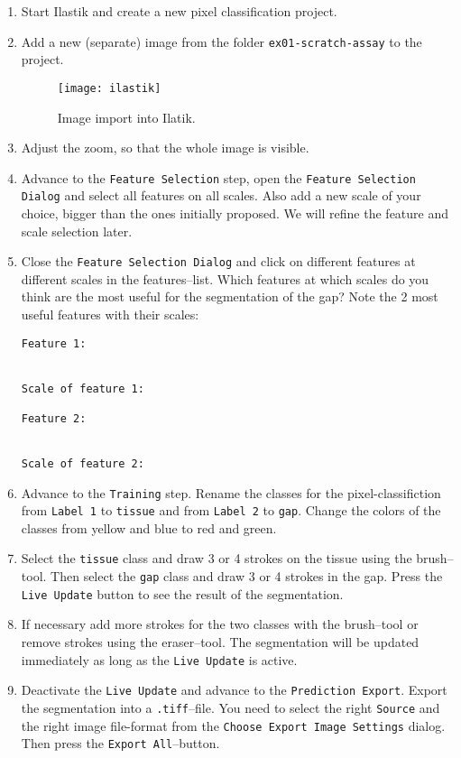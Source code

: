 \begin{enumerate}
\item Start Ilastik and create a new pixel classification project.
\item Add a new (separate) image from the folder {\tt ex01-scratch-assay} to the project.
\begin{figure}[!htb]
 \centering
 \texttt{[image: ilastik]}
 \caption{Image import into Ilatik.}
 \label{figure:ilastik}
\end{figure}
\item Adjust the zoom, so that the whole image is visible.
\item Advance to the {\tt Feature Selection} step, open the {\tt Feature Selection Dialog} and select all features on all scales. Also add a new scale of your choice, bigger than the ones initially proposed. We will refine the feature and scale selection later.
\item Close the {\tt Feature Selection Dialog} and click on different features at different scales in the features--list. Which features at which scales do you think are the most useful for the segmentation of the gap? Note the 2 most useful features with their scales:
\begin{verbatim}
Feature 1:


Scale of feature 1:

Feature 2:


Scale of feature 2:

\end{verbatim} 
\item Advance to the {\tt Training} step. Rename the classes for the pixel-classifiction from {\tt Label 1} to {\tt tissue} and from {\tt Label 2} to {\tt gap}. Change the colors of the classes from yellow and blue to red and green.

\item Select the {\tt tissue} class and draw 3 or 4 strokes on the tissue using the brush--tool. Then select the {\tt gap} class and draw 3 or 4 strokes in the gap. Press the {\tt Live Update} button to see the result of the segmentation.

\item If necessary add more strokes for the two classes with the brush--tool or remove strokes using the eraser--tool. The segmentation will be updated immediately as long as the {\tt Live Update} is active.

\item Deactivate the {\tt Live Update} and advance to the {\tt Prediction Export}. Export the segmentation into a {\tt .tiff}--file. You need to select the right {\tt Source} and the right image file-format from the {\tt Choose Export Image Settings} dialog. Then press the {\tt Export All}--button.


\end{enumerate}
